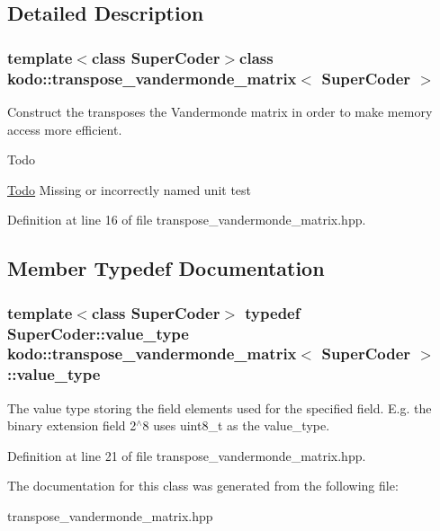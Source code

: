 \subsection{Detailed Description}
\subsubsection*{template$<$class Super\-Coder$>$class kodo\-::transpose\-\_\-vandermonde\-\_\-matrix$<$ Super\-Coder $>$}

Construct the transposes the Vandermonde matrix in order to make memory access more efficient. 

\begin{DoxyRefDesc}{Todo}
\item[\hyperlink{todo__todo000049}{Todo}]Missing or incorrectly named unit test \end{DoxyRefDesc}


Definition at line 16 of file transpose\-\_\-vandermonde\-\_\-matrix.\-hpp.



\subsection{Member Typedef Documentation}
\hypertarget{classkodo_1_1transpose__vandermonde__matrix_a24fd34e538dbeb7b1ae43b1c462cf2ee}{
\subsubsection[{value\-\_\-type}]{\setlength{\rightskip}{0pt plus 5cm}template$<$class Super\-Coder$>$ typedef Super\-Coder\-::value\-\_\-type {\bf kodo\-::transpose\-\_\-vandermonde\-\_\-matrix}$<$ Super\-Coder $>$\-::{\bf value\-\_\-type}}}\label{classkodo_1_1transpose__vandermonde__matrix_a24fd34e538dbeb7b1ae43b1c462cf2ee}




The value type storing the field elements used for the specified field. E.\-g. the binary extension field 2$^\wedge$8 uses uint8\-\_\-t as the value\-\_\-type. 

Definition at line 21 of file transpose\-\_\-vandermonde\-\_\-matrix.\-hpp.



The documentation for this class was generated from the following file\-:\begin{DoxyCompactItemize}
\item 
transpose\-\_\-vandermonde\-\_\-matrix.\-hpp\end{DoxyCompactItemize}
